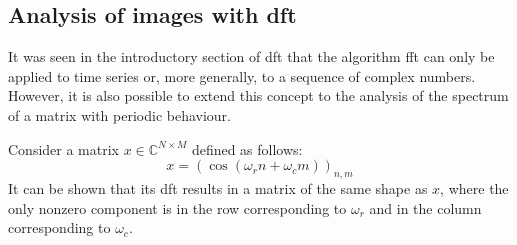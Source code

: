 \begin{toReview}

\subsection{Analysis of images with \gls{dft}}
It was seen in the introductory section of \gls{dft} that the algorithm \gls{fft} can only be applied to time series or, more generally, to a sequence of complex numbers. However, it is also possible to extend this concept to the analysis of the spectrum of a matrix with periodic behaviour.

\noindent Consider a matrix $x \in \mathbb{C}^{N \times M}$ defined as follows:
\[
x = \left(\cos\left(\omega_rn+\omega_cm\right)\right)_{n,m}
\]
It can be shown that its \gls{dft} results in a matrix of the same shape as $x$, where the only nonzero component is in the row corresponding to $\omega_r$ and in the column corresponding to $\omega_c$.


\end{toReview}
